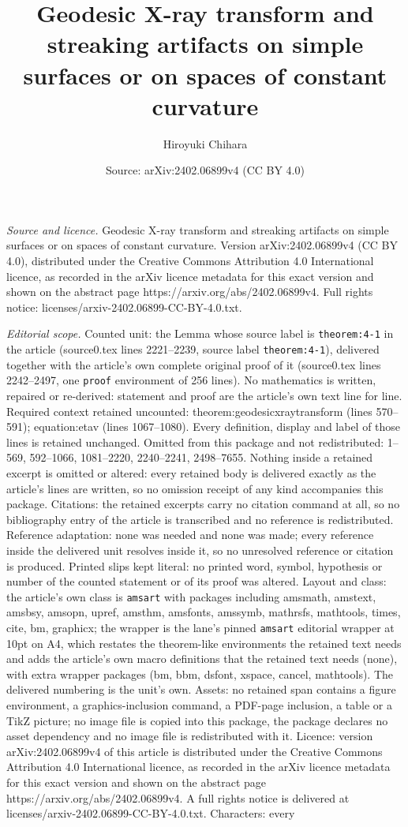 \documentclass[10pt,a4paper]{amsart}
\title[Geodesic X-ray transform and streaking artifacts on simple s]{Geodesic X-ray transform and streaking artifacts on simple surfaces or on spaces of constant curvature}
\author{Hiroyuki Chihara}
\date{Source: arXiv:2402.06899v4 (CC BY 4.0)}
\begin{document}
\maketitle

\noindent\emph{Source and licence.} Geodesic X-ray transform and streaking artifacts on simple surfaces or on spaces of constant curvature. Version arXiv:2402.06899v4 (CC BY 4.0), distributed under the Creative Commons Attribution 4.0 International licence, as recorded in the arXiv licence metadata for this exact version and shown on the abstract page https://arxiv.org/abs/2402.06899v4. Full rights notice: licenses/arxiv-2402.06899-CC-BY-4.0.txt.\par\smallskip

\noindent\textit{Editorial scope.} Counted unit: the Lemma whose source label is \texttt{theorem:4-1} in the article (source0.tex lines 2221--2239, source label \texttt{theorem:4-1}), delivered together with the article's own complete original proof of it (source0.tex lines 2242--2497, one \texttt{proof} environment of 256 lines). No mathematics is written, repaired or re-derived: statement and proof are the article's own text line for line. Required context retained uncounted: theorem:geodesicxraytransform (lines 570--591); equation:etav (lines 1067--1080). Every definition, display and label of those lines is retained unchanged. Omitted from this package and not redistributed: 1--569, 592--1066, 1081--2220, 2240--2241, 2498--7655. Nothing inside a retained excerpt is omitted or altered: every retained body is delivered exactly as the article's lines are written, so no omission receipt of any kind accompanies this package. Citations: the retained excerpts carry no citation command at all, so no bibliography entry of the article is transcribed and no reference is redistributed. Reference adaptation: none was needed and none was made; every reference inside the delivered unit resolves inside it, so no unresolved reference or citation is produced. Printed slips kept literal: no printed word, symbol, hypothesis or number of the counted statement or of its proof was altered. Layout and class: the article's own class is \texttt{amsart} with packages including amsmath, amstext, amsbsy, amsopn, upref, amsthm, amsfonts, amssymb, mathrsfs, mathtools, times, cite, bm, graphicx; the wrapper is the lane's pinned \texttt{amsart} editorial wrapper at 10pt on A4, which restates the theorem-like environments the retained text needs and adds the article's own macro definitions that the retained text needs (none), with extra wrapper packages (bm, bbm, dsfont, xspace, cancel, mathtools). The delivered numbering is the unit's own. Assets: no retained span contains a figure environment, a graphics-inclusion command, a PDF-page inclusion, a table or a TikZ picture; no image file is copied into this package, the package declares no asset dependency and no image file is redistributed with it. Licence: version arXiv:2402.06899v4 of this article is distributed under the Creative Commons Attribution 4.0 International licence, as recorded in the arXiv licence metadata for this exact version and shown on the abstract page https://arxiv.org/abs/2402.06899v4. A full rights notice is delivered at licenses/arxiv-2402.06899-CC-BY-4.0.txt. Characters: every 
\end{document}
